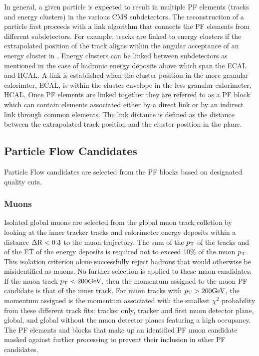 In general, a given particle is expected to result in multiple PF elements (tracks and energy
clusters) in the various CMS subdetectors. The reconstruction of a particle first proceeds 
with a link algorithm that connects the PF elements from different subdetectors. For example,
tracks are linked to energy clusters if the extrapolated position of the track aligns within the
angular acceptance of an energy cluster in \etaphi. Energy clusters can be linked between subdetectors as mentioned
in the case of hadronic energy deposits above which span the ECAL and HCAL. A link is established
when the cluster position in the more granular calorimter, ECAL, is within the cluster envelope
in the less granular calorimeter, HCAL. Once PF elements are linked together they are referred to as a PF block which can contain 
elements associated either by a direct link or by an indirect link through common elements.
The link distance is defined as the distance between the extrapolated track position and the 
cluster position in the \etaphi plane.


\subsection{Particle Flow Candidates}
Particle Flow candidates are selected from the PF blocks based on designated quality cuts.


\subsubsection{Muons}
Isolated global muons are selected from the global muon track colletion by looking at the inner
tracker tracks and calorimeter 
energy deposits within a distance $\Delta \mathrm{R} < 0.3$ to the muon trajectory. 
The sum of the $p_\mathrm{T}$ of the tracks and of the ET of the energy deposits is required not to 
exceed 10\% of the muon $p_\mathrm{T}$. This isolation criterion alone successfully reject hadrons that would
otherwise be misidentified as muons. No further selection is applied to these muon candidates.
If the muon track $p_\mathrm{T} < 200\mathrm{GeV}$, then the momentum assigned to the muon PF candidate is that of 
the inner track. For muon tracks with $p_\mathrm{T} > 200\mathrm{GeV}$, the momentum assigned is the momentum associated
with the smallest $\chi^2$ probability from these different track fits: tracker only, tracker and 
first muon detector plane, global, and global without the muon detector planes featuring a high occupancy.
The PF elements and blocks that make up an identified PF muon candidate masked against further processing
to prevent their inclusion in other PF candidates.

